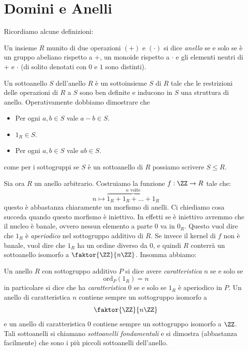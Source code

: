 \documentclass[11pt]{scrartcl}
\newcommand{\ordine}[2]{\text{ord}_{#1}\left(#2\right)}
\begin{document}
	\section{Domini e Anelli}
	Ricordiamo alcune definizioni:
	\begin{definition}[Anello]
		Un insieme $R$ munito di due operazioni $(+)$ e $(\cdot)$ si dice \textit{anello} se e solo se è un gruppo abeliano rispetto a $+$, un monoide rispetto a $\cdot$ e gli elementi neutri di $+$ e $\cdot$ (di solito denotati con $0$ e $1$ sono distinti). 
	\end{definition}
	\begin{definition}[Sottoanello]
		Un sottoanello $S$ dell'anello $R$ è un sottoinsieme $S$ di $R$ tale che le restrizioni delle operazioni di $R$ a $S$ sono ben definite e inducono in $S$ una struttura di anello. Operativamente dobbiamo dimostrare che 
		\begin{itemize}
			\item Per ogni $a,b\in S$ vale $a-b\in S$.
			\item $1_R\in S$.
			\item Per ogni $a,b\in S$ vale $ab\in S$.
		\end{itemize}
		come per i sottogruppi se $S$ è un sottoanello di $R$ possiamo scrivere $S\le R$.
	\end{definition}
	Sia ora $R$ un anello arbitrario. Costruiamo la funzione $f:\ZZ\to R$ tale che:
	$$n\mapsto \overset{\text{$n$ volte}}{\overbrace{1_R+1_R+\dots+1_R}} $$
	questo è abbastanza chiaramente un morfismo di anelli. Ci chiediamo cosa succeda quando questo morfismo è iniettivo. In effetti se è iniettivo avremmo che il nucleo è banale, ovvero nessun elemento a parte $0$ va in $0_R$. Questo vuol dire che $1_R$ è \textit{aperiodico} nel sottogruppo additivo di $R$. Se invece il kernel di $f$ non è banale, vuol dire che $1_R$ ha un ordine diverso da $0$, e quindi $R$ conterrà un sottoanello isomorfo a $\faktor{\ZZ}{n\ZZ}$. Insomma abbiamo:
	\begin{definition}
		Un anello $R$ con sottogruppo additivo $P$ si dice avere \textit{caratteristica} $n$ se e solo se
		$$\ordine{P}{1_R}=n$$
		in particolare si dice che ha \textit{caratteristica} $0$ se e solo se $1_R$ è aperiodico in $P$. Un anello di caratteristica $n$ contiene sempre un sottogruppo isomorfo a 
		$$\faktor{\ZZ}{n\ZZ}$$
		e un anello di caratteristica $0$ contiene sempre un sottogruppo isomorfo a $\ZZ$. Tali sottoanelli si chiamano \textit{sottoanelli fondamentali} e si dimostra (abbastanza facilmente) che sono i più piccoli sottoanelli dell'anello. 
	\end{definition}
\end{document}
